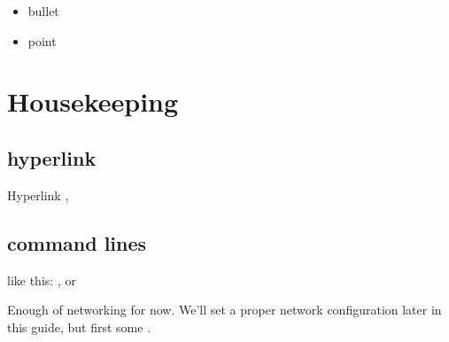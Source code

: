 \documentclass[letterpaper,10pt,openany,oneside,english]{sphinxmanual}
\begin{document}
\begin{itemize}
\item {} 
bullet

\item {} 
point

\end{itemize}


\section{Housekeeping}
\label{\detokenize{networkmaint:housekeeping}}\label{\detokenize{networkmaint::doc}}

\subsection{hyperlink}
\label{\detokenize{networkmaint:hyperlink}}
Hyperlink ,


\subsection{command lines}
\label{\detokenize{networkmaint:command-lines}}
like this: ,  or

Enough of networking for now. We’ll set a proper network configuration later in this guide, but first some .
\end{document}
